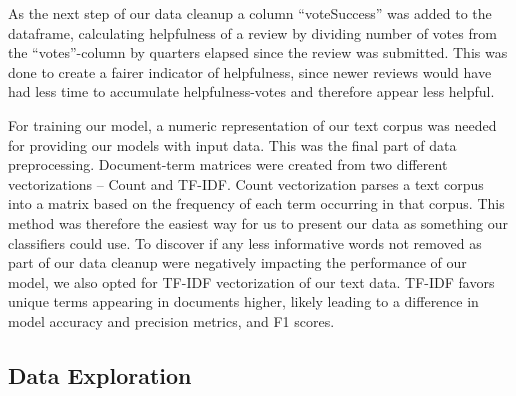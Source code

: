 \documentclass[twoside,twocolumn]{article}
\begin{document}
As the next step of our data cleanup a column “voteSuccess” was added to the dataframe, calculating helpfulness of a review by dividing number of votes from the “votes”-column by quarters elapsed since the review was submitted. This was done to create a fairer indicator of helpfulness, since newer reviews would have had less time to accumulate helpfulness-votes and therefore appear less helpful.

For training our model, a numeric representation of our text corpus was needed for providing our models with input data. This was the final part of data preprocessing. Document-term matrices were created from two different vectorizations – Count\cite{sklearn:CountVectorizer} and TF-IDF\cite{sklearn:TfIdfVectorizer}. Count vectorization parses a text corpus into a matrix based on the frequency of each term occurring in that corpus. This method was therefore the easiest way for us to present our data as something our classifiers could use. To discover if any less informative words not removed as part of our data cleanup were negatively impacting the performance of our model, we also opted for TF-IDF vectorization of our text data. TF-IDF favors unique terms appearing in documents higher, likely leading to a difference in model accuracy and precision metrics, and F1 scores.

\subsection{Data Exploration}
\end{document}
